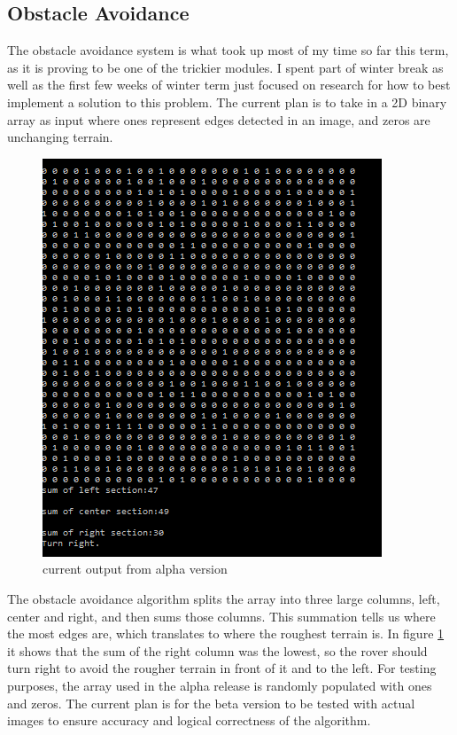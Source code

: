 \documentclass[10pt,letterpaper,onecolumn,draftclsnofoot,journal]{IEEEtran}
\begin{document}
\subsection{Obstacle Avoidance}
The obstacle avoidance system is what took up most of my time so far this term, as it is proving to be one of the trickier modules. I spent part of winter break as well as the first few weeks of winter term just focused on research for how to best implement a solution to this problem. The current plan is to take in a 2D binary array as input where ones represent edges detected in an image, and zeros are unchanging terrain.
\begin{figure}[h]
	\includegraphics[scale = .75]{obstacleavoidance.png}
	\caption{current output from alpha version}
	\label{fig:obstacle}
\end{figure}
\par
The obstacle avoidance algorithm splits the array into three large columns, left, center and right, and then sums those columns. This summation tells us where the most edges are, which translates to where the roughest terrain is. In figure \ref{fig:obstacle} it shows that the sum of the right column was the lowest, so the rover should turn right to avoid the rougher terrain in front of it and to the left. For testing purposes, the array used in the alpha release is randomly populated with ones and zeros. The current plan is for the beta version to be tested with actual images to ensure accuracy and logical correctness of the algorithm.
\end{document}
